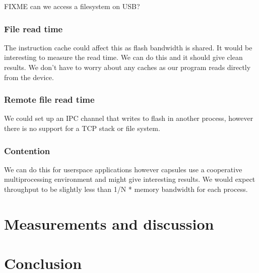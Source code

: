 \documentclass{article}
\begin{document}
FIXME can we access a filesystem on USB?

\subsubsection{File read time}
The instruction cache could affect this as flash bandwidth is shared. It would be interesting to measure the read time. We can do this and it should give clean results. We don't have to worry about any caches as our program reads directly from the device.

\subsubsection{Remote file read time}
We could set up an IPC channel that writes to flash in another process, however there is no support for a TCP stack or file system.

\subsubsection{Contention}
We can do this for userspace applications however capsules use a cooperative multiprocessing environment and might give interesting results. We would expect throughput to be slightly less than 1/N * memory bandwidth for each process. 

\section{Measurements and discussion}

\section{Conclusion}

\printbibliography
\end{document}
